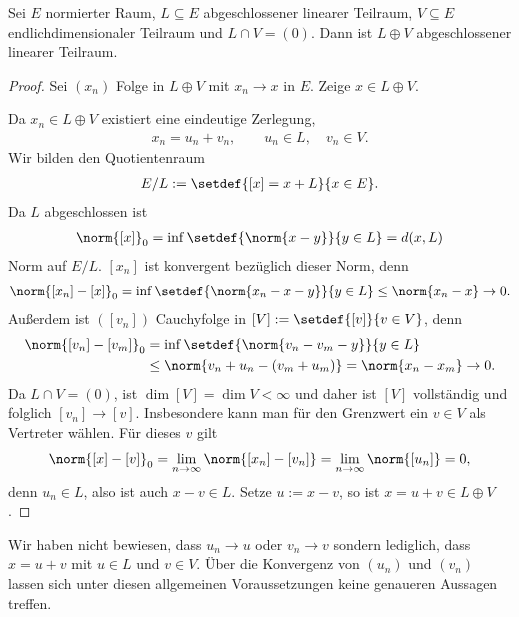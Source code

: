 \begin{lem}
\label{prop:6.27}
Sei $E$ normierter Raum, $L\subseteq E$ abgeschlossener linearer Teilraum,
$V\subseteq E$ endlichdimensionaler Teilraum und $L\cap V = (0)$. Dann ist
$L\oplus V$ abgeschlossener linearer Teilraum.\fishhere
\end{lem}
\begin{proof}
Sei $(x_n)$ Folge in $L\oplus V$ mit $x_n\to x$ in $E$. Zeige $x\in L\oplus V$.

Da $x_n\in L\oplus V$ existiert eine eindeutige Zerlegung,
\begin{align*}
x_n = u_n + v_n,\qquad u_n\in L,\quad v_n\in V.
\end{align*}
Wir bilden den Quotientenraum
\begin{align*}
E/L := \setdef{[x]=x+L}{x\in E}.
\end{align*}
Da $L$ abgeschlossen ist
\begin{align*}
\norm{[x]}_0 = \inf\setdef{\norm{x-y}}{y\in L} = d(x,L)
\end{align*}
Norm auf $E/L$. $[x_n]$ ist konvergent bezüglich dieser Norm, denn
\begin{align*}
\norm{[x_n]-[x]}_0 = 
\inf\setdef{\norm{x_n-x-y}}{y\in L} \le \norm{x_n-x}\to 0.
\end{align*}
Außerdem ist $([v_n])$ Cauchyfolge in $[V]:=\setdef{[v]}{v\in V}$, denn
\begin{align*}
\norm{[v_n]-[v_m]}_0 &= \inf\setdef{\norm{v_n-v_m-y}}{y\in L}\\
&\le \norm{v_n+u_n - (v_m+u_m)} = \norm{x_n-x_m} \to 0.
\end{align*}
Da $L\cap V = (0)$, ist $\dim [V] = \dim V < \infty$ und daher ist $[V]$
vollständig und folglich $[v_n]\to [v]$. Insbesondere kann man für den
Grenzwert ein $v\in V$ als Vertreter wählen. Für dieses $v$ gilt
\begin{align*}
\norm{[x]-[v]}_0 = \lim\limits_{n\to\infty} \norm{[x_n]-[v_n]}
= \lim\limits_{n\to\infty} \norm{[u_n]} = 0, 
\end{align*}
denn $u_n\in L$, also ist auch $x-v\in L$. Setze $u:=x-v$, so ist $x=u+v\in
L\oplus V$.\qedhere
\end{proof}

Wir haben nicht bewiesen, dass $u_n\to u$ oder $v_n\to v$ sondern lediglich,
dass $x=u+v$ mit $u\in L$ und $v\in V$. Über die Konvergenz von $(u_n)$ und
$(v_n)$ lassen sich unter diesen allgemeinen Voraussetzungen keine genaueren
Aussagen treffen.

